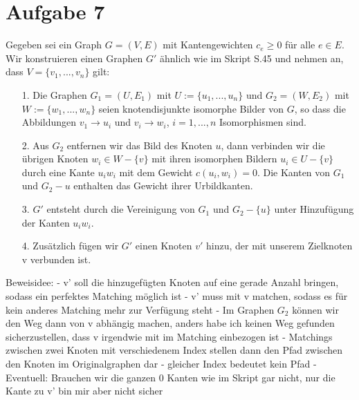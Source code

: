 \documentclass[a4paper,10pt,german]{scrartcl}
\begin{document}
\section*{Aufgabe 7}
Gegeben sei ein Graph $G = (V,E)$ mit Kantengewichten $c_e \ge 0$ für alle $e \in E$. Wir konstruieren einen Graphen $G'$ ähnlich wie im Skript S.45 und nehmen an, dass $V = \{v_1,...,v_n\}$ gilt:
\begin{enumerate}
	\item[1.] Die Graphen $G_1 = (U,E_1)$ mit $U := \{u_1,...,u_n\}$ und $G_2 = (W,E_2)$ mit $W := \{w_1,...,w_n\}$ seien knotendisjunkte isomorphe Bilder von $G$, so dass die Abbildungen $v_1 \rightarrow u_i $ und $v_i \rightarrow w_i$, $i = 1,...,n$ Isomorphismen sind.
	\item[2.] Aus $G_2$ entfernen wir das Bild des Knoten $u$, dann verbinden wir die übrigen Knoten $w_i \in W - \{v\}$ mit ihren isomorphen  Bildern $u_i \in U - \{v\}$ durch eine Kante $u_iw_i$ mit dem Gewicht $c(u_i,w_i)=0$. Die Kanten von $G_1$ und $G_2 - {u}$ enthalten das Gewicht ihrer Urbildkanten.
	\item[3.] $G'$ entsteht durch die Vereinigung von $G_1$ und $G_2 - \{u\}$ unter Hinzufügung der Kanten $u_iw_i$.
	\item[4.] Zusätzlich fügen wir $G'$ einen Knoten $v'$ hinzu, der mit unserem Zielknoten v verbunden ist.  
\end{enumerate}

Beweisidee:
- v' soll die hinzugefügten Knoten auf eine gerade Anzahl bringen, sodass ein perfektes Matching möglich ist
- v' muss mit v matchen, sodass es für kein anderes Matching mehr zur Verfügung steht
- Im Graphen $G_2$ können wir den Weg dann von v abhängig machen, anders habe ich keinen Weg gefunden sicherzustellen, dass v irgendwie mit im Matching einbezogen ist
- Matchings zwischen zwei Knoten mit verschiedenem Index stellen dann den Pfad zwischen den Knoten im Originalgraphen dar
- gleicher Index bedeutet kein Pfad
- Eventuell: Brauchen wir die ganzen 0 Kanten wie im Skript gar nicht, nur die Kante zu v' bin mir aber nicht sicher
\end{document}
